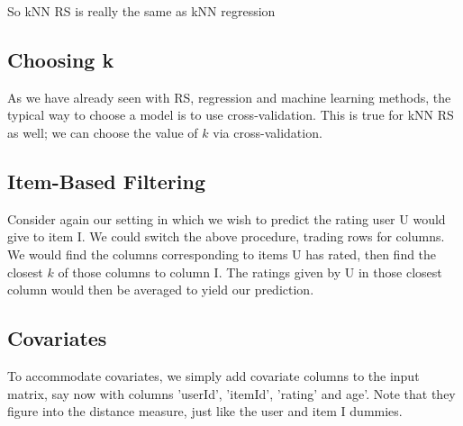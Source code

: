 So kNN RS is really the same as kNN regression

\subsection{Choosing k}

As we have already seen with RS, regression and machine learning methods, 
the typical way to choose a model is to use cross-validation.  This is
true for kNN RS as well; we can choose the value of $k$ via
cross-validation.  

% 
% 
% 

\subsection{Item-Based Filtering}

Consider again our setting in which we wish to predict the rating user U
would give to item I.  We could switch the above procedure, trading rows
for columns.  We would find the columns corresponding to items U has
rated, then find the closest $k$ of those columns to column I.  The
ratings given by U in those closest column would then be averaged to
yield our prediction.

\subsection{Covariates}

To accommodate covariates, we simply add covariate columns to the input
matrix, say now with columns 'userId', 'itemId', 'rating' and age'.
Note that they figure into the distance measure, just like the user and
item I dummies.


